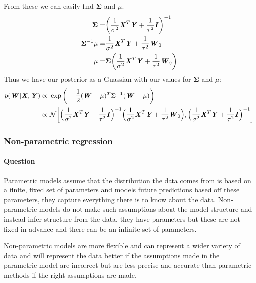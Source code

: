 \documentclass{article}
\newcounter{question}
\newcommand{\question}{\stepcounter{question}\paragraph{Question \thequestion}}
\newcommand{\mat}[1]{\textbf{\textit{#1}}}
\begin{document}
From these we can easily find $\mathbf{\Sigma}$ and $\mu$.
\begin{align*}
	\mathbf{\Sigma} = &\bigg(\frac{1}{\sigma^2}\mat{X}^T\mat{Y}+\frac{1}{\tau^2}\mat{I}\bigg)^{-1} \\
	\mathbf{\Sigma}^{-1}\mu = &\frac{1}{\sigma^2}\mat{X}^T\mat{Y} + \frac{1}{\tau^2}\mat{W}_0 \\
	\mu = &\mathbf{\Sigma}\bigg(\frac{1}{\sigma^2}\mat{X}^T\mat{Y} + \frac{1}{\tau^2}\mat{W}_0\bigg) \\
\end{align*}
Thus we have our posterior as a Guassian with our values for $\mathbf{\Sigma}$ and $\mu$:
\begin{align*}
	p(\mat{W}|\mat{X},\mat{Y}) \propto\ &\exp\bigg(-\frac{1}{2}(\mat{W}-\mu)^T\Sigma^{-1}(\mat{W}-\mu)\bigg)\\
	\propto\ &\mathcal{N}\bigg[\Big(\frac{1}{\sigma^2}\mat{X}^T\mat{Y}+\frac{1}{\tau^2}\mat{I}\Big)^{-1}\Big(\frac{1}{\sigma^2}\mat{X}^T\mat{Y} + \frac{1}{\tau^2}\mat{W}_0\Big),\Big(\frac{1}{\sigma^2}\mat{X}^T\mat{Y}+\frac{1}{\tau^2}\mat{I}\Big)^{-1}\bigg]
\end{align*}
\subsubsection{Non-parametric regression}
\question Parametric models assume that the distribution the data comes from is based on a finite, fixed set of parameters and models future predictions based off these parameters, they capture everything there is to know about the data. Non-parametric models do not make such assumptions about the model structure and instead infer structure from the data, they have parameters but these are not fixed in advance and there can be an infinite set of parameters.

Non-parametric models are more flexible and can represent a wider variety of data and will represent the data better if the assumptions made in the parametric model are incorrect but are less precise and accurate than parametric methods if the right assumptions are made.
\end{document}
